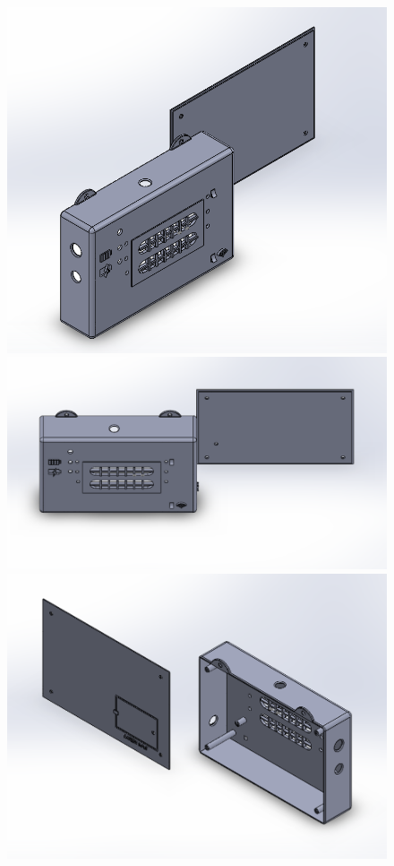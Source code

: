 \documentclass[twocolumn]{article}
\begin{document}
\begin{figure}[h]
\centering
\begin{minipage}[b]{0.2\textwidth}
\includegraphics[width=\textwidth]{7.png}
\end{minipage}
\hfill
\begin{minipage}[b]{0.2\textwidth}
\includegraphics[width=\textwidth]{8.png}
\end{minipage}
\hfill
\begin{minipage}[b]{0.2\textwidth}
\includegraphics[width=\textwidth]{9.png}

\end{minipage}
\end{figure}
\end{document}
